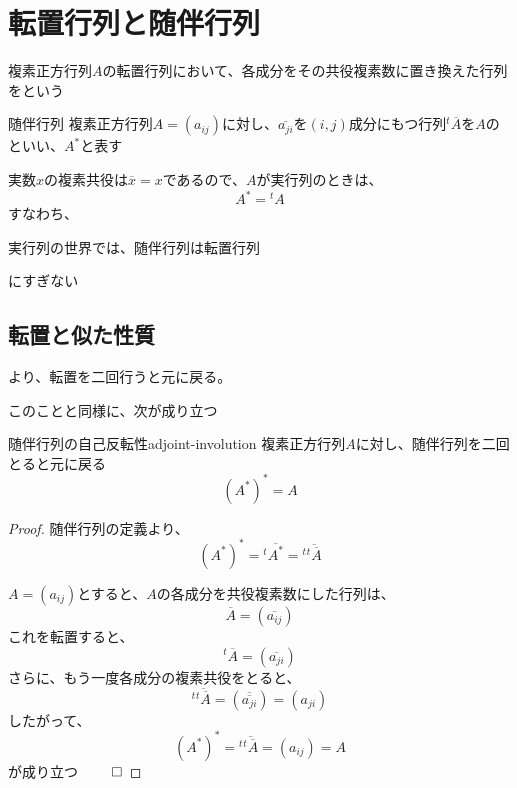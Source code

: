 \documentclass[../../../topic_linear-algebra]{subfiles}
\begin{document}
\sectionline
\section{転置行列と随伴行列}

複素正方行列$A$の転置行列において、各成分をその共役複素数に置き換えた行列をという

\begin{definition*}{随伴行列}
  複素正方行列$A = (a_{ij})$に対し、$\overline{a_{ji}}$を$(i,j)$成分にもつ行列${}^t\overline{A}$を$A$のといい、$A^*$と表す
\end{definition*}

実数$x$の複素共役は$\overline{x} = x$であるので、$A$が実行列のときは、
\begin{equation*}
  A^* = {}^t A
\end{equation*}
すなわち、
\begin{shaded}
  実行列の世界では、随伴行列は転置行列
\end{shaded}
にすぎない

\subsection{転置と似た性質}

より、転置を二回行うと元に戻る。

このことと同様に、次が成り立つ

\begin{theorem}{随伴行列の自己反転性}{adjoint-involution}
  複素正方行列$A$に対し、随伴行列を二回とると元に戻る
  \begin{equation*}
    (A^*)^* = A
  \end{equation*}
\end{theorem}

\begin{proof}
  随伴行列の定義より、
  \begin{equation*}
    (A^*)^* = {}^t\overline{A^*} = {}^t\overline{{}^t\overline{A}}
  \end{equation*}

  $A = (a_{ij})$とすると、$A$の各成分を共役複素数にした行列は、
  \begin{equation*}
    \overline{A} = (\overline{a_{ij}})
  \end{equation*}
  これを転置すると、
  \begin{equation*}
    {}^t\overline{A} = (\overline{a_{ji}})
  \end{equation*}
  さらに、もう一度各成分の複素共役をとると、
  \begin{equation*}
    {}^t\overline{{}^t\overline{A}} = (\overline{\overline{a_{ji}}}) = (a_{ji})
  \end{equation*}
  したがって、
  \begin{equation*}
    (A^*)^* = {}^t\overline{{}^t\overline{A}} = (a_{ij}) = A
  \end{equation*}
  が成り立つ $\qed$
\end{proof}
\end{document}
